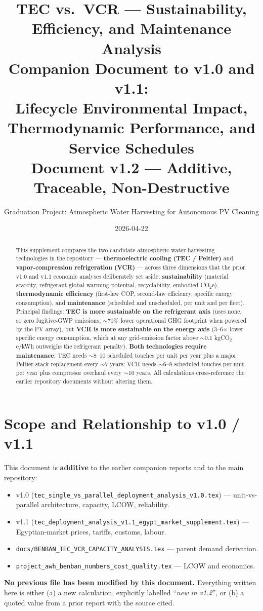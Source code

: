 \documentclass[11pt,a4paper]{article}
\title{\textbf{TEC vs.\ VCR --- Sustainability, Efficiency, and Maintenance Analysis}\\
\large Companion Document to v1.0 and v1.1:\\
Lifecycle Environmental Impact, Thermodynamic Performance, and Service Schedules\\
\normalsize Document v1.2 --- Additive, Traceable, Non-Destructive}
\author{Graduation Project: Atmospheric Water Harvesting for Autonomous PV Cleaning}
\date{2026-04-22}
\begin{document}
\maketitle

\begin{abstract}
\noindent
This supplement compares the two candidate atmospheric-water-harvesting technologies in the repository --- \textbf{thermoelectric cooling (TEC / Peltier)} and \textbf{vapor-compression refrigeration (VCR)} --- across three dimensions that the prior v1.0 and v1.1 economic analyses deliberately set aside: \textbf{sustainability} (material scarcity, refrigerant global warming potential, recyclability, embodied CO$_2$e), \textbf{thermodynamic efficiency} (first-law COP, second-law efficiency, specific energy consumption), and \textbf{maintenance} (scheduled and unscheduled, per unit and per fleet). Principal findings: \textbf{TEC is more sustainable on the refrigerant axis} (uses none, so zero fugitive-GWP emissions; $\sim$70\% lower operational GHG footprint when powered by the PV array), but \textbf{VCR is more sustainable on the energy axis} (3--6$\times$ lower specific energy consumption, which at any grid-emission factor above $\sim$0.1 kgCO$_2$e/kWh outweighs the refrigerant penalty). \textbf{Both technologies require maintenance}: TEC needs $\sim$8--10 scheduled touches per unit per year plus a major Peltier-stack replacement every $\sim$7 years; VCR needs $\sim$6--8 scheduled touches per unit per year plus compressor overhaul every $\sim$10 years. All calculations cross-reference the earlier repository documents without altering them.
\end{abstract}

\tableofcontents
\bigskip

\section{Scope and Relationship to v1.0 / v1.1}
\label{sec:scope}
This document is \textbf{additive} to the earlier companion reports and to the main repository:
\begin{itemize}[leftmargin=*]
  \item v1.0 (\texttt{tec\_single\_vs\_parallel\_deployment\_analysis\_v1.0.tex}) --- unit-vs-parallel architecture, capacity, LCOW, reliability.
  \item v1.1 (\texttt{tec\_deployment\_analysis\_v1.1\_egypt\_market\_supplement.tex}) --- Egyptian-market prices, tariffs, customs, labour.
  \item \texttt{docs/BENBAN\_TEC\_VCR\_CAPACITY\_ANALYSIS.tex} --- parent demand derivation.
  \item \texttt{project\_awh\_benban\_numbers\_cost\_quality.tex} --- LCOW and economics.
\end{itemize}
\textbf{No previous file has been modified by this document.} Everything written here is either (a) a new calculation, explicitly labelled ``\emph{new in v1.2}'', or (b) a quoted value from a prior report with the source cited.
\end{document}
